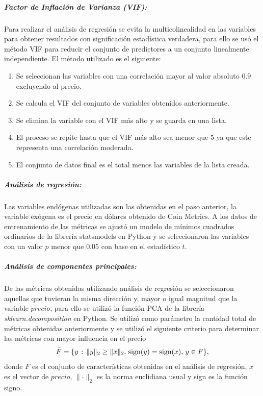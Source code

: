\subparagraph{Factor de Inflación de Varianza (VIF):}

Para realizar el análisis de regresión se evita la multicolinealidad en las variables para obtener resultados con significación estadística verdadera, para ello se usó el método VIF para reducir el conjunto de predictores a un conjunto linealmente independiente. El método utilizado es el siguiente:

\begin{enumerate}
	\item Se seleccionan las variables con una correlación mayor al valor absoluto $0.9$ excluyendo al precio.
	\item Se calcula el VIF del conjunto de variables obtenidos anteriormente.
	\item Se elimina la variable con el VIF más alto y se guarda en una lista.
	\item El proceso se repite hasta que el VIF más alto sea menor que $5$ ya que este representa una correlación moderada.
	\item El conjunto de datos final es el total menos las variables de la lista creada.
\end{enumerate}


\subparagraph{Análisis de regresión:}
\label{AR}
Las variables endógenas utilizadas son las obtenidas en el paso anterior, la variable exógena es el precio en dólares obtenido de Coin Metrics. 
A los datos de entrenamiento de las métricas se ajustó un modelo de mínimos cuadrados ordinarios de la librería statsmodels en Python y se seleccionaron las variables con un valor $p$ menor que $0.05$ con base en el estadístico $t$.

\subparagraph{Análisis de componentes principales:}
\label{PCA}

De las métricas obtenidas utilizando análisis de regresión se seleccionaron aquellas que tuvieran la misma dirección y, mayor o igual magnitud que la variable $precio$, para ello se utilizó la función PCA de la librería \emph{sklearn.decomposition} en Python.
Se utilizó como parámetro la cantidad total de métricas obtenidas anteriormente y se utilizó el siguiente criterio para determinar las métricas con mayor influencia en el precio
\[ \bar{F} = \{ y \hspace{0.5mm}:\hspace{0.5mm} \lVert y \rVert_2 \geq \lVert x \rVert_2,\hspace{0.5mm} \textrm{sign}(y) = \textrm{sign}(x),\hspace{0.5mm}y \in F\}, \]
donde $F$ es el conjunto de características obtenidas en el análisis de regresión, $x$ es el vector de $precio$, $\lVert \cdot \rVert_2$ es la norma euclidiana usual y sign es la función signo.

